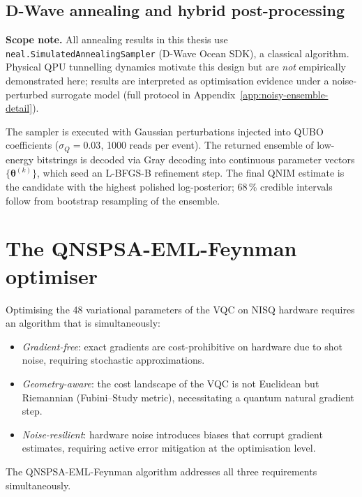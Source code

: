 \documentclass[11pt,a4paper, english]{book}
\theoremstyle{plain}
\theoremstyle{definition}
\numberwithin{equation}{chapter}
\numberwithin{figure}{chapter}
\numberwithin{table}{chapter}
\begin{document}
\subsection{D-Wave annealing and hybrid post-processing}
\label{subsec:annealing}

\noindent\textbf{Scope note.} All annealing results in this thesis use
\texttt{neal.SimulatedAnnealingSampler} (D-Wave Ocean SDK), a classical
algorithm. Physical QPU tunnelling dynamics motivate this design but are
\emph{not} empirically demonstrated here; results are interpreted as
optimisation evidence under a noise-perturbed surrogate model (full protocol
in Appendix~\ref{app:noisy-ensemble-detail}).

The sampler is executed with Gaussian perturbations injected into QUBO
coefficients ($\sigma_Q = 0.03$, 1000 reads per event). The returned
ensemble of low-energy bitstrings is decoded via Gray decoding into
continuous parameter vectors $\{\boldsymbol{\theta}^{(k)}\}$, which seed
an L-BFGS-B refinement step. The final QNIM estimate is the candidate with
the highest polished log-posterior; 68\,\% credible intervals follow from
bootstrap resampling of the ensemble.


\section{The QNSPSA-EML-Feynman optimiser}
\label{sec:optimizer}

Optimising the 48 variational parameters of the VQC on NISQ hardware
requires an algorithm that is simultaneously:
\begin{itemize}
  \item \emph{Gradient-free}: exact gradients are cost-prohibitive on
        hardware due to shot noise, requiring stochastic approximations.
  \item \emph{Geometry-aware}: the cost landscape of the VQC is not
        Euclidean but Riemannian (Fubini--Study metric), necessitating
        a quantum natural gradient step.
  \item \emph{Noise-resilient}: hardware noise introduces biases that
        corrupt gradient estimates, requiring active error mitigation
        at the optimisation level.
\end{itemize}
The QNSPSA-EML-Feynman algorithm addresses all three requirements
simultaneously.
\end{document}
